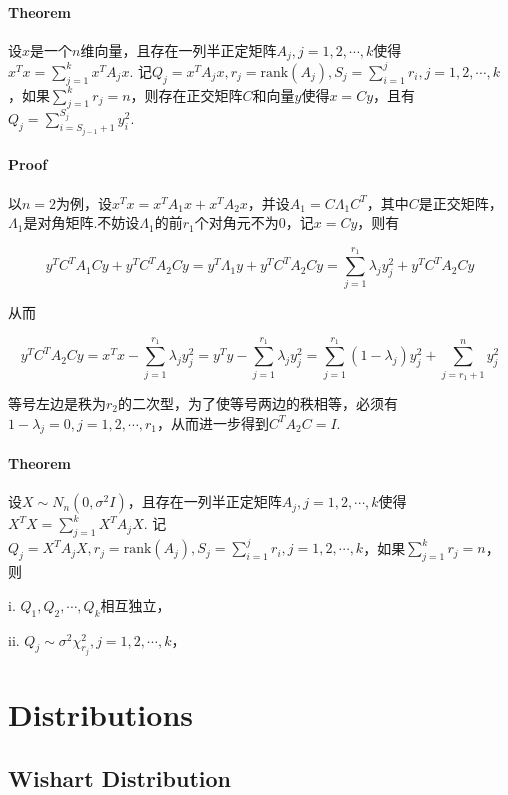 \documentclass[a4paper,11pt]{article}
\begin{document}
\paragraph{Theorem} 
设$x$是一个$n$维向量，且存在一列半正定矩阵$A_j, j=1,2,\cdots, k$使得$x^Tx = \sum_{j=1}^kx^TA_jx$. 记$Q_j  = x^TA_jx, r_j = \textrm{rank}(A_j), S_j = \sum_{i = 1}^jr_i, j=1,2,\cdots, k$，如果$\sum_{j=1}^kr_j=n$，则存在正交矩阵$C$和向量$y$使得$x = Cy$，且有$Q_j = \sum_{i = S_{j-1} + 1}^{S_j}y_i^2$.
\paragraph{Proof}
以$n=2$为例，设$x^Tx = x^TA_1x  + x^TA_2x$，并设$A_1 = C\Lambda_1C^T$，其中$C$是正交矩阵，$\Lambda_1$是对角矩阵.不妨设$\Lambda_1$的前$r_1$个对角元不为0，记$x = Cy$，则有

\begin{displaymath}
y^TC^TA_1Cy  + y^TC^TA_2Cy =  y^T\Lambda_1 y  + y^TC^TA_2Cy = \sum_{j=1}^{r_1}\lambda_jy_j^2 + y^TC^TA_2Cy
\end{displaymath}

从而

\begin{displaymath}
y^TC^TA_2Cy = x^Tx - \sum_{j=1}^{r_1}\lambda_jy_j^2 = y^Ty - \sum_{j=1}^{r_1}\lambda_jy_j^2 = \sum_{j=1}^{r_1}(1 - \lambda_j)y_j^2 + \sum_{j=r_1 + 1}^{n}y_j^2
\end{displaymath}

等号左边是秩为$r_2$的二次型，为了使等号两边的秩相等，必须有$1 - \lambda_j=0, j=1,2,\cdots, r_1$，从而进一步得到$C^TA_2C = I$. 

\paragraph{Theorem}
设$X \sim N_n(0, \sigma^2I)$，且存在一列半正定矩阵$A_j, j=1,2,\cdots, k$使得$X^TX = \sum_{j=1}^kX^TA_jX$.
记$Q_j  = X^TA_jX, r_j = \textrm{rank}(A_j), S_j = \sum_{i = 1}^jr_i, j=1,2,\cdots, k$，如果$\sum_{j=1}^kr_j=n$，则

i. $Q_1, Q_2, \cdots, Q_k$相互独立，

ii. $Q_j \sim \sigma^2\chi^2_{r_j}, j=1,2,\cdots, k$，


\section{Distributions}
\subsection{Wishart Distribution}
\end{document}
